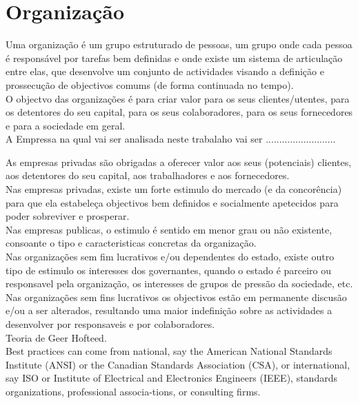 \section{Organização}

Uma organização é um grupo estruturado de pessoas, um grupo onde cada pessoa é responsável por tarefas bem definidas e onde existe um sistema de articulação entre elas, que desenvolve um conjunto de actividades visando a definição e prossecução de objectivos comums (de forma continuada no tempo).\\

O objectvo das organizações é para criar valor para os seus clientes/utentes, para os detentores do seu capital, para os seus colaboradores, para os seus fornecedores e para a sociedade em geral.\\

A Empressa na qual vai ser analisada neste trabalaho vai ser ..........................

As empresas privadas são obrigadas a oferecer valor aos seus (potenciais) clientes, aos detentores do seu capital, aos trabalhadores e aos fornecedores.\\
Nas empresas privadas, existe um forte estimulo do mercado (e da concorência) para que ela estabeleça objectivos bem definidos e socialmente apetecidos para poder sobreviver e prosperar.\\

Nas empresas publicas, o estimulo é sentido em menor grau ou não existente, consoante o tipo e caracteristicas concretas da organização.\\

Nas organizações sem fim lucrativos e/ou dependentes do estado, existe outro tipo de estimulo os interesses dos governantes, quando o estado é parceiro ou responsavel pela organização, os interesses de grupos de pressão da sociedade, etc.\\

Nas organizações sem fins lucrativos os objectivos estão em permanente discusão e/ou a ser alterados, resultando uma maior indefinição sobre as actividades a desenvolver por responsaveis e por colaboradores.\\

Teoria de Geer Hofteed.\\

Best practices can come from national, say the American National Standards Institute (ANSI) or the Canadian Standards Association (CSA), or international, say ISO or Institute of Electrical and Electronics Engineers (IEEE), standards organizations, professional associa-tions, or consulting firms.\\

